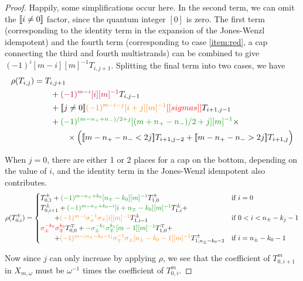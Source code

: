 \documentclass{article}
\begin{document}
\begin{proof}
Happily, some simplifications occur here. In the second term, we can omit the $[\![ i\neq0 ]\!]$ factor, since the quantum integer $[0]$ is zero. The first term (corresponding to the identity term in the expansion of the Jones-Wenzl idempotent) and the fourth term (corresponding to case \eqref{item:red}, a cap connecting the third and fourth multistrands) can be combined to give $(-1)^i [m-i][m]^{-1} T_{i,j+1}$. Splitting the final term into two cases, we have
\begin{align*}
\rho(T_{i,j}) & =
T_{i, j + 1} \\
& \qquad +
\textcolor{purple}{(-1)^{m-i} [i][m]^{-1}} T_{i,j-1} \\
& \qquad +
\truth{j \neq 0}\textcolor{orange}{(-1)^{m-i-j} [i+j][m]^{-1}} \nn{sigmas} T_{i+1, j-1} \\
& \qquad +
\textcolor{DarkGreen}{(-1)^{(m - n_+ + n_-)/2 + j} [(m + n_+ - n_-)/2 + j][m]^{-1}} \times \\
& \qquad \qquad \times \Big(
\truth{m-n_+-n_- < 2j}  T_{i+1,j-2} + \truth{m-n_+-n_- > 2j} T_{i+1,j}
\Big)
\end{align*}



When $j=0$, there are either 1 or 2 places for a cap on the bottom, depending on the value of $i$, and the identity term in the Jones-Wenzl idempotent also contributes.
$$
\rho(T^\pm_{0,i}) = 
\begin{cases}
T^\pm_{0,1}
+\textcolor{DarkGreen}{(-1)^{m-n_\mp+k_0}[n_\mp-k_0][m]^{-1}} T^\pm_{1,0}&\text{if $i=0$}
\\
T^\pm_{0,i+1}
+\textcolor{DarkGreen}{(-1)^{m-n_\mp+k_0-i}[i+n_\mp-k_0][m]^{-1}} T^\pm_{1,i} +
\\ \qquad + \textcolor{orange}{(-1)^{m-i} \sigma^{-1}_\mp\sigma_\pm [i][m]^{-1}} T^\pm_{1,i-1}
&\text{if }0 < i <n_\pm-k_j-1
\\
\textcolor{red}{\sigma_\pm^{-k_0} \sigma_\mp^{k_0}} T^\mp_{0,0}
+\textcolor{DarkGreen}{-\sigma_\pm^{-k_1} \sigma_\mp^{k_1} [m-1][m]^{-1} } T^\mp_{1,0} +
\\ \qquad +\textcolor{orange}{(-1)^{m-(n_\pm-k_0-1)} \sigma^{-1}_\mp\sigma_\pm [n_\pm-k_0-1][m]^{-1} } T^\pm_{1,n_\pm-k_0-2}
&\text{if } i = n_\pm-k_0-1
\end{cases}
$$

Now since $j$ can only increase by applying $\rho$, we see that the coefficient of $T^m_{0,i+1}$ in $X_{m,\omega}$ must be $\omega^{-1}$ times the coefficient of $T^m_{0,i}$.


\end{proof}
\end{document}
